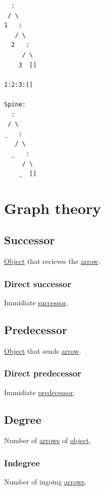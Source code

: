 \documentclass[a4paper,14pt,oneside]{book}
\begin{document}
{\begin{verbatim}
  :
 / \
1   :
   / \
  2   :
     / \
    3  []

1:2:3:[]

Spine:
  :
 / \
_   :
   / \
  _   :
     / \
    _  []

\end{verbatim}

\chapter{\label{org152974c}Graph theory}
\label{sec:org2a008da}
\section{\label{orgc61a5c5}Successor}
\label{sec:orged98c7c}
\hyperref[orgcc1bbec]{Object} that recieves the \hyperref[org4ef5cf1]{arrow}.\\

\subsection{\label{orgbd21eda}Direct successor}
\label{sec:org3a00f6c}
Immidiate \hyperref[orgc61a5c5]{successor}.\\

\section{\label{org686d773}Predecessor}
\label{sec:org77e8970}
\hyperref[orgcc1bbec]{Object} that sends \hyperref[org4ef5cf1]{arrow}.\\

\subsection{\label{org10c5ebb}Direct predecessor}
\label{sec:org05209f0}
Immidiate \hyperref[org686d773]{predecessor}.\\


\section{\label{orgc130df6}Degree}
\label{sec:org31ce324}
Number of \hyperref[org3a8dbdc]{arrows} of \hyperref[orgcc1bbec]{object}.\\

\subsection{\label{org918946d}Indegree}
\label{sec:org66d3dbb}
Number of ingoing \hyperref[org3a8dbdc]{arrows}.\\

}
\end{document}
